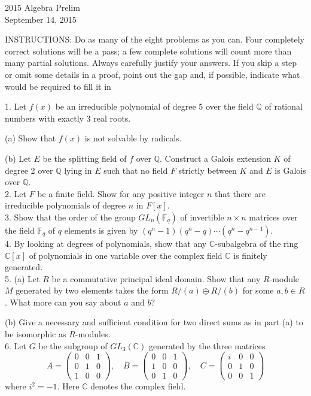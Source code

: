 \documentclass[11pt]{article}
\newcommand{\Q}{\mathbb{Q}}
\newcommand{\F}{\mathbb{F}}
\newcommand{\C}{\mathbb{C}}
\begin{document}
\begin{center}
\Large 2015 Algebra Prelim\\
\normalsize September 14, 2015
\end{center}
\vspace{1em}

INSTRUCTIONS: Do as many of the eight problems as you can. Four completely
correct solutions will be a pass; a few complete solutions will count more than many
partial solutions. Always carefully justify your answers. If you skip a step or omit
some details in a proof, point out the gap and, if possible, indicate what would be
required to fill it in\\
\vspace{1em}

1. Let $f(x)$ be an irreducible polynomial of degree 5 over the field $\Q$ of rational
numbers with exactly 3 real roots.

(a) Show that $f(x)$ is not solvable by radicals.

(b) Let $E$ be the splitting field of $f$ over $\Q$. Construct a Galois extension $K$ of
degree 2 over $\Q$ lying in $E$ such that no field $F$ strictly between $K$ and $E$ is
Galois over $\Q$.\\

2. Let $F$ be a finite field. Show for any positive integer $n$ that there are irreducible
polynomials of degree $n$ in $F[x]$.\\

3. Show that the order of the group $GL_n(\F_q)$ of invertible $n\times n$ matrices over the field $\F_q$ of $q$ elements is given by $(q^n -1)(q^n-q)\cdots (q^n-q^{n-1})$. \\

4. By looking at degrees of polynomials, show that any $\C$-subalgebra of the ring
$\C[x]$ of polynomials in one variable over the complex field $\C$ is finitely generated.\\

5. (a) Let $R$ be a commutative principal ideal domain. Show that any $R$-module $M$
generated by two elements takes the form $R/(a)\oplus R/(b)$ for some $a, b\in R$.
What more can you say about $a$ and $b$?

(b) Give a necessary and sufficient condition for two direct sums as in part (a) to
be isomorphic as $R$-modules.\\

6. Let $G$ be the subgroup of $GL_3(\C)$ generated by the three matrices\[
A = \begin{pmatrix}
0&0&1\\0&1&0\\1&0&0
\end{pmatrix}, \quad B= \begin{pmatrix}
0&0&1\\1&0&0\\0&1&0
\end{pmatrix}, \quad C = \begin{pmatrix}
i&0&0\\0&1&0\\0&0&1
\end{pmatrix}
\]
where  $i^2=-1$. Here $\C$ denotes the complex field. 
\end{document}
